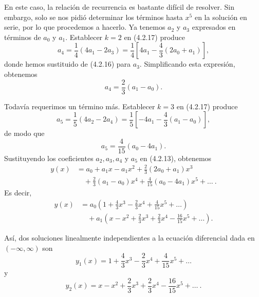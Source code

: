 \begin{example}
En este caso, la relación de recurrencia es bastante difícil de resolver. Sin embargo, solo se nos pidió determinar los términos hasta $x^5$ en la solución en serie, por lo que procedemos a hacerlo. Ya tenemos $a_2$ y $a_3$ expresados en términos de $a_0$ y $a_1$. Establecer $k = 2$ en (4.2.17) produce
\[ a_4 = \frac{1}{4}(4a_1 - 2a_3) = \frac{1}{4}\left[ 4a_1 - \frac{4}{3}(2a_0 + a_1) \right], \]
donde hemos sustituido de (4.2.16) para $a_3$. Simplificando esta expresión, obtenemos
\[ a_4 = \frac{2}{3}(a_1 - a_0). \]

Todavía requerimos un término más. Establecer $k = 3$ en (4.2.17) produce
\[ a_5 = \frac{1}{5}(4a_2 - 2a_4) = \frac{1}{5}\left[ -4a_1 - \frac{4}{3}(a_1 - a_0) \right], \]
de modo que
\[ a_5 = \frac{4}{15}(a_0 - 4a_1). \]
Sustituyendo los coeficientes $a_2, a_3, a_4$ y $a_5$ en (4.2.13), obtenemos
\begin{align*}
y(x) &= a_0 + a_1 x - a_1 x^2 + \frac{2}{3}(2a_0 + a_1)x^3 \\
&\quad + \frac{2}{3}(a_1 - a_0)x^4 + \frac{4}{15}(a_0 - 4a_1)x^5 + \dots \ .
\end{align*}
Es decir,
\begin{align*}
y(x) &= a_0 \left( 1 + \frac{4}{3}x^3 - \frac{2}{3}x^4 + \frac{4}{15}x^5 + \dots \right) \\
&\quad + a_1 \left( x - x^2 + \frac{2}{3}x^3 + \frac{2}{3}x^4 - \frac{16}{15}x^5 + \dots \right).
\end{align*}

Así, dos soluciones linealmente independientes a la ecuación diferencial dada en $(-\infty, \infty)$ son
\[ y_1(x) = 1 + \frac{4}{3}x^3 - \frac{2}{3}x^4 + \frac{4}{15}x^5 + \dots \]
y
\[ y_2(x) = x - x^2 + \frac{2}{3}x^3 + \frac{2}{3}x^4 - \frac{16}{15}x^5 + \dots \ . \tag*{$\square$} \]

\end{example}